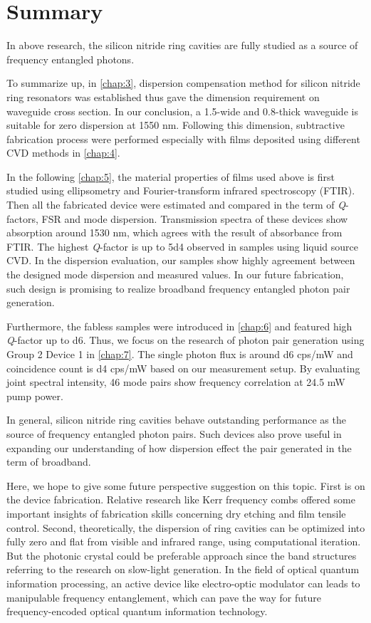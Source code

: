 
\chapter{Summary}

In above research, the silicon nitride ring cavities are fully studied as a source of frequency entangled photons. 

To summarize up, in \autoref{chap:3}, dispersion compensation method for silicon nitride ring resonators was established thus gave the dimension requirement on waveguide cross section. 
In our conclusion, a 1.5\um-wide and 0.8\um-thick waveguide is suitable for zero dispersion at 1550 nm.
Following this dimension, subtractive fabrication process were performed especially with films deposited using different CVD methods in \autoref{chap:4}. 

In the following \autoref{chap:5}, the material properties of films used above is first studied using ellipsometry and Fourier-transform infrared spectroscopy (FTIR). Then all the fabricated device were estimated and compared in the term of \textit{Q}-factors, FSR and mode dispersion. 
Transmission spectra of these devices show absorption around 1530 nm, which agrees with the result of absorbance from FTIR.
The highest \textit{Q}-factor is up to \num{5d4} observed in samples using liquid source CVD. In the dispersion evaluation, our samples show highly agreement between the designed mode dispersion and measured values. In our future fabrication, such design is promising to realize broadband frequency entangled photon pair generation.

Furthermore, the fabless samples were introduced in \autoref{chap:6} and featured high \textit{Q}-factor up to \num{d6}. Thus, we focus on the research of photon pair generation using Group 2 Device 1 in \autoref{chap:7}. The single photon flux is around \num{d6} cps/mW and coincidence count is \num{d4} cps/mW based on our measurement setup. By evaluating joint spectral intensity, 46 mode pairs show frequency correlation at 24.5 mW pump power.

\newpage

In general, silicon nitride ring cavities behave outstanding performance as the source of frequency entangled photon pairs.
Such devices also prove useful in expanding our understanding of how dispersion effect the pair generated in the term of broadband.

Here, we hope to give some future perspective suggestion on this topic. First is on the device fabrication. Relative research like Kerr frequency combs offered some important insights of fabrication skills concerning dry etching and film tensile control. Second, theoretically, the dispersion of ring cavities can be optimized into fully zero and flat from visible and infrared range, using computational iteration. But the photonic crystal could be preferable approach since the band structures referring to the research on slow-light generation. In the field of optical quantum information processing, an active device like electro-optic modulator can leads to manipulable frequency entanglement, which can pave the way for future frequency-encoded optical quantum information technology.